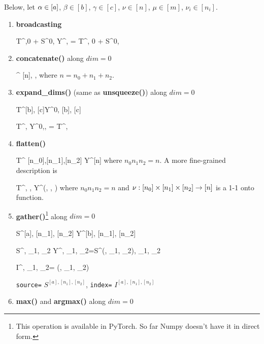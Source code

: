 Below, let $\alpha\in[a]$, $\beta\in[b]$, $\gamma\in[c]$,
$\nu\in[n]$,
$\mu\in[m]$,
$\nu_i\in[n_i]$.


\begin{enumerate}
\item {\bf broadcasting}

\beq
T^{\alpha,0} + S^{0,\beta}
\rarrow Y^{\alp, \beta}=
T^{\alpha, 0} + S^{0,\beta}
\eeq

\item {\bf concatenate()} along $dim=0$

\rarrow
{}^{
[n], \beta, \gamma}
\eeq
where $n= n_0 + n_1 + n_2$.

\item {\bf expand\_dims()} (same as {\bf unsqueeze()}) along $dim=0$

\beq
T^{[b], [c]}\rarrow Y^{0, [b], [c]}
\eeq

\beq
T^{\beta, \gamma}
\rarrow
Y^{0,\beta, \gamma} =  T^{\beta, \gamma}
\eeq

\item {\bf flatten()}

\beq
T^{
{[n_0]},{[n_1]},{[n_2]}}\rarrow
Y^{[n]}
\eeq
where $n_0n_1n_2=n$.
A more fine-grained description is

\beq
T^{
{\alpha, \beta, \gamma}}\rarrow
Y^{\nu(\alpha, \beta, \gamma)}
\eeq
where
$n_0 n_1 n_2=n$ and
$\nu:[n_0]\times[n_1]\times[n_2]\rightarrow [n]$
is a 1-1 onto function.


\item {\bf gather()}\footnote{This operation is available in
PyTorch. So far Numpy doesn't have it in direct form.} along $dim=0$


\beq
S^{[a], [n_1], [n_2]}
\rarrow Y^{[b], [n_1], [n_2]}
\eeq

\beq
S^{\alp, \nu_1, \nu_2}
\rarrow
Y^{\beta, \nu_1, \nu_2}=S^{\beta(\alp, \nu_1, \nu_2),
\nu_1, \nu_2}
\eeq

\beq
I^{\alp, \nu_1, \nu_2}=
\beta(\alp, \nu_1, \nu_2)
\eeq

{\tt source=} $S^{[a], [n_1], [n_2]}$,
{\tt index=} $I^{[a], [n_1], [n_2]}$

\item {\bf max()} and {\bf argmax()} along $dim=0$


\end{enumerate}

